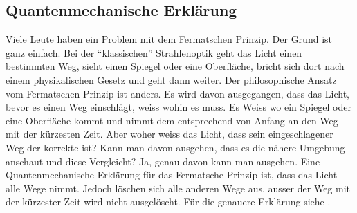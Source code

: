 \subsection{Quantenmechanische Erklärung}
Viele Leute haben ein Problem mit dem Fermatschen Prinzip. 
Der Grund ist ganz einfach. 
Bei der ``klassischen'' Strahlenoptik geht das Licht einen bestimmten Weg, 
sieht einen Spiegel oder eine Oberfläche, bricht sich dort nach einem 
physikalischen Gesetz und geht dann weiter.
Der philosophische Ansatz vom Fermatschen Prinzip ist anders. 
Es wird davon ausgegangen, dass das Licht, bevor es einen Weg einschlägt, 
weiss wohin es muss. Es Weiss wo ein Spiegel oder eine Oberfläche kommt und 
nimmt dem entsprechend von Anfang an den Weg mit der kürzesten Zeit.
Aber woher weiss das Licht, dass sein eingeschlagener Weg der korrekte ist?
Kann man davon ausgehen, dass es die nähere Umgebung anschaut und diese Vergleicht?
Ja, genau davon kann man ausgehen. Eine Quantenmechanische Erklärung für das Fermatsche Prinzip ist, 
dass das Licht alle Wege nimmt. Jedoch löschen sich alle anderen Wege aus, 
ausser der Weg mit der kürzester Zeit wird nicht ausgelöscht.
Für die genauere Erklärung siehe \cite{quanten}.
